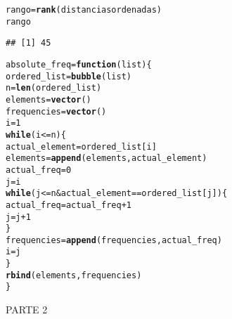 \documentclass[12pt]{report}\usepackage[]{graphicx}\usepackage[dvipsnames]{xcolor}
\makeatletter
\newcommand{\hlnum}[1]{\textcolor[rgb]{0.686,0.059,0.569}{#1}}%
\newcommand{\hlopt}[1]{\textcolor[rgb]{0,0,0}{#1}}%
\newcommand{\hlstd}[1]{\textcolor[rgb]{0.345,0.345,0.345}{#1}}%
\newcommand{\hlkwa}[1]{\textcolor[rgb]{0.161,0.373,0.58}{\textbf{#1}}}%
\newcommand{\hlkwb}[1]{\textcolor[rgb]{0.69,0.353,0.396}{#1}}%
\newcommand{\hlkwc}[1]{\textcolor[rgb]{0.333,0.667,0.333}{#1}}%
\newcommand{\hlkwd}[1]{\textcolor[rgb]{0.737,0.353,0.396}{\textbf{#1}}}%
\newenvironment{kframe}{%
 \def\at@end@of@kframe{}%
 \ifinner\ifhmode%
  \def\at@end@of@kframe{\end{minipage}}%
  \begin{minipage}{\columnwidth}%
 \fi\fi%
 \def\FrameCommand##1{\hskip\@totalleftmargin \hskip-\fboxsep
 \colorbox{shadecolor}{##1}\hskip-\fboxsep
     \hskip-\linewidth \hskip-\@totalleftmargin \hskip\columnwidth}%
 \MakeFramed {\advance\hsize-\width
   \@totalleftmargin\z@ \linewidth\hsize
   \@setminipage}}%
 {\par\unskip\endMakeFramed%
 \at@end@of@kframe}
\newenvironment{knitrout}{}{} %
\makeatother
\begin{document}
\begin{knitrout}
\begin{kframe}
\begin{alltt}
\hlstd{rango} \hlkwb{=} \hlkwd{rank}\hlstd{(distanciasordenadas)}
\hlstd{rango}
\end{alltt}
\begin{verbatim}
## [1] 45
\end{verbatim}
\begin{alltt}
\hlstd{absolute_freq} \hlkwb{=} \hlkwa{function}\hlstd{(}\hlkwc{list}\hlstd{)\{}
        \hlstd{ordered_list} \hlkwb{=} \hlkwd{bubble}\hlstd{(list)}
        \hlstd{n} \hlkwb{=} \hlkwd{len}\hlstd{(ordered_list)}
        \hlstd{elements} \hlkwb{=} \hlkwd{vector}\hlstd{()}
        \hlstd{frequencies} \hlkwb{=} \hlkwd{vector}\hlstd{()}
        \hlstd{i} \hlkwb{=} \hlnum{1}
        \hlkwa{while} \hlstd{(i} \hlopt{<=} \hlstd{n)\{}
                \hlstd{actual_element} \hlkwb{=} \hlstd{ordered_list[i]}
                \hlstd{elements} \hlkwb{=} \hlkwd{append}\hlstd{(elements, actual_element)}
                \hlstd{actual_freq} \hlkwb{=} \hlnum{0}
                \hlstd{j} \hlkwb{=} \hlstd{i}
                \hlkwa{while}\hlstd{(j} \hlopt{<=} \hlstd{n} \hlopt{&} \hlstd{actual_element} \hlopt{==} \hlstd{ordered_list[j])\{}
                        \hlstd{actual_freq} \hlkwb{=} \hlstd{actual_freq} \hlopt{+} \hlnum{1}
                        \hlstd{j} \hlkwb{=} \hlstd{j}\hlopt{+}\hlnum{1}
                \hlstd{\}}
                \hlstd{frequencies} \hlkwb{=} \hlkwd{append}\hlstd{(frequencies, actual_freq)}
                \hlstd{i} \hlkwb{=} \hlstd{j}
        \hlstd{\}}
        \hlkwd{rbind}\hlstd{(elements, frequencies)}
\hlstd{\}}
\end{alltt}
\end{kframe}
\end{knitrout}

PARTE 2
\end{document}

